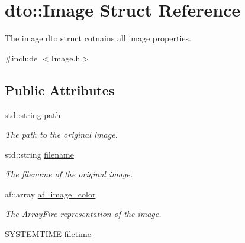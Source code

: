 \hypertarget{structdto_1_1_image}{}\section{dto\+:\+:Image Struct Reference}
\label{structdto_1_1_image}


The image dto struct cotnains all image properties.  




{\ttfamily \#include $<$Image.\+h$>$}

\subsection*{Public Attributes}
\begin{DoxyCompactItemize}
\item 
\mbox{\label{structdto_1_1_image_a42dd8e0f83770e858e9de89a12a1ae18}} 
std\+::string \mbox{\hyperlink{structdto_1_1_image_a42dd8e0f83770e858e9de89a12a1ae18}{path}}
\begin{DoxyCompactList}\small\item\em The path to the original image. \end{DoxyCompactList}\item 
\mbox{\label{structdto_1_1_image_a92a65a9b13c3e2343e116bcbde3b52c7}} 
std\+::string \mbox{\hyperlink{structdto_1_1_image_a92a65a9b13c3e2343e116bcbde3b52c7}{filename}}
\begin{DoxyCompactList}\small\item\em The filename of the original image. \end{DoxyCompactList}\item 
\mbox{\label{structdto_1_1_image_a7274d5de7fef58621afc4d20fa1884a2}} 
af\+::array \mbox{\hyperlink{structdto_1_1_image_a7274d5de7fef58621afc4d20fa1884a2}{af\+\_\+image\+\_\+color}}
\begin{DoxyCompactList}\small\item\em The Array\+Fire representation of the image. \end{DoxyCompactList}\item 
\mbox{\label{structdto_1_1_image_a19614e71fc508933feba9d88bc4762d7}} 
S\+Y\+S\+T\+E\+M\+T\+I\+ME \mbox{\hyperlink{structdto_1_1_image_a19614e71fc508933feba9d88bc4762d7}{filetime}}

\end{DoxyCompactItemize}
